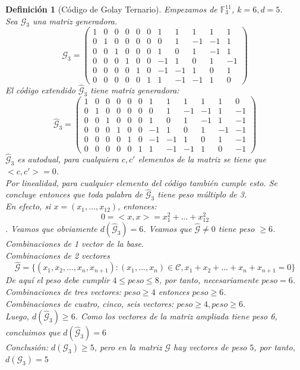 \documentclass[spanish]{book}
\newtheorem{mydef}{Definición}
\begin{document}
\begin{mydef}[Código de Golay Ternario]
	Empezamos de $\mathbb{F}_3^{11}$, $k=6, d=5$. \\
	Sea $\mathcal{G}_3$ una matriz generadora.
	$$ \mathcal{G}_3=
	\left(
	\begin{array}{cccccc|ccccc}
	1 & 0 & 0 & 0 & 0 & 0 & 1 & 1 & 1 & 1 & 1 \\ \hline
	0 & 1 & 0 & 0 & 0 & 0 & 0 & 1 & -1 & -1 & 1 \\
	0 & 0 & 1 & 0 & 0 & 0 & 1 & 0 & 1 & -1 & 1  \\
	0 & 0 & 0 & 1 & 0 & 0 & -1 & 1 & 0 & 1 & -1 \\
	0 & 0 & 0 & 0 & 1 & 0 & -1 & -1 & 1 & 0 & 1 \\
	0 & 0 & 0 & 0 & 0 & 1 & 1 & -1 & -1 & 1 & 0
	\end{array}
	\right)
	 $$
	 El código extendido $\hat{\mathcal{G}}_3$ tiene matriz generadora:
	 $$ \hat{\mathcal{G}}_3=\left(
	 \begin{array}{cccccc|ccccc|c}
	 1 & 0 & 0 & 0 & 0 & 0 & 1 & 1 & 1 & 1 & 1 & 0 \\ \hline
	 0 & 1 & 0 & 0 & 0 & 0 & 0 & 1 & -1 & -1 & 1 & -1 \\
	 0 & 0 & 1 & 0 & 0 & 0 & 1 & 0 & 1 & -1 & 1 & -1 \\
	 0 & 0 & 0 & 1 & 0 & 0 & -1 & 1 & 0 & 1 & -1 & -1 \\
	 0 & 0 & 0 & 0 & 1 & 0 & -1 & -1 & 1 & 0 & 1 & -1 \\
	 0 & 0 & 0 & 0 & 0 & 1 & 1 & -1 & -1 & 1 & 0 & -1
	 \end{array}
	 \right) $$
	 $\hat{\mathcal{G}}_3$ es autodual, para cualquiera $c, c'$ elementos de la matriz se tiene que $<c, c'>=0$. \\
	 Por linealidad, para cualquier elemento del código también cumple esto. Se concluye entonces que toda palabra de $\hat{\mathcal{G}}_3$ tiene peso múltiplo de 3. \\
	 En efecto, si $x=(x_1,..., x_{12})$, entonces: $$ 0=<x, x>=x_1^2+...+x_12^2$$.
	 Veamos que obviamente $d(\hat{\mathcal{G}}_3)=6$. Veamos que $\hat{\mathcal{G}} \neq 0$ tiene peso $\geq 6$.  \\
	 Combinaciones de 1 vector de la base. \\
	 Combinaciones de 2 vectores
	 $$ \hat{\mathcal{G}}=\{ (x_1, x_2, ..., x_n, x_{n+1}) : (x_1, ..., x_n) \in \mathcal{C}, x_1+x_2+...+x_n+x_{n+1}=0 \} $$ De aquí el peso debe cumplir $4 \leq peso \leq 8$, por tanto, necesariamente $peso=6$. \\
	 Combinaciones de tres vectores:  $peso \geq 4$ entonces $peso \geq 6$. \\
	 Combinaciones de cuatro, cinco, seis vectores: $peso \geq 4, peso \geq 6$. \\
	 Luego, $d(\hat{\mathcal{G}}_3)\geq 6$. Como los vectores de la matriz ampliada tiene peso 6, concluimos que  $d(\hat{\mathcal{G}}_3) =6$
	 \\
	 Conclusión: $d({\mathcal{G}}_3) \geq 5$, pero en la matriz $\mathcal{G}$ hay vectores de peso $5$, por tanto, $d({\mathcal{G}}_3) = 5$
\end{mydef}
\end{document}
